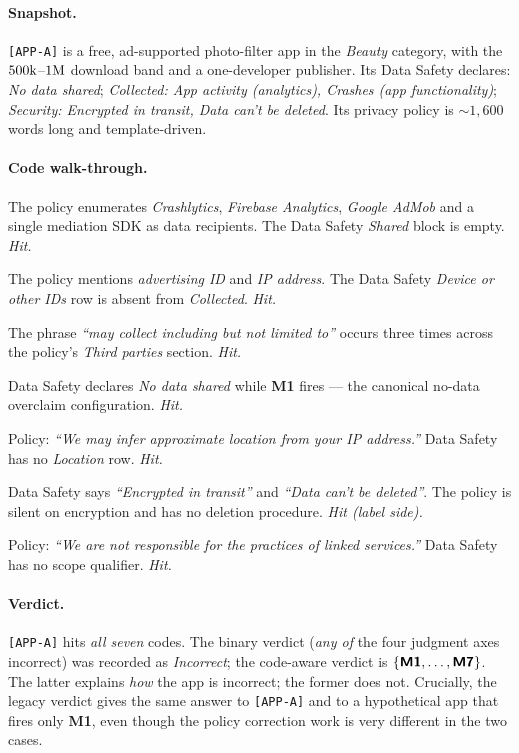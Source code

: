 \documentclass[11pt,a4paper]{article}
\newcommand{\code}[1]{\textsf{\textbf{#1}}}
\begin{document}
\paragraph{Snapshot.} \texttt{[APP-A]} is a free, ad-supported
photo-filter app in the \emph{Beauty} category, with the
$500{\rm k}$--$1{\rm M}$ download band and a one-developer publisher.
Its Data Safety declares: \textsl{No data shared}; \textsl{Collected: App
activity (analytics), Crashes (app functionality)}; \textsl{Security:
Encrypted in transit, Data can't be deleted}. Its privacy policy is
$\sim 1{,}600$ words long and template-driven.

\paragraph{Code walk-through.}
\begin{description}[topsep=2pt,itemsep=2pt,leftmargin=1.6em]
\item[\code{M1}] The policy enumerates \emph{Crashlytics}, \emph{Firebase
Analytics}, \emph{Google AdMob} and a single mediation SDK as data
recipients. The Data Safety \textsl{Shared} block is empty. \emph{Hit.}
\item[\code{M2}] The policy mentions \emph{advertising ID} and
\emph{IP address}. The Data Safety \textsl{Device or other IDs} row is
absent from \textsl{Collected}. \emph{Hit.}
\item[\code{M3}] The phrase \emph{``may collect including but not
limited to''} occurs three times across the policy's
\emph{Third parties} section. \emph{Hit.}
\item[\code{M4}] Data Safety declares \textsl{No data shared} while
\code{M1} fires --- the canonical no-data overclaim configuration.
\emph{Hit.}
\item[\code{M5}] Policy: \emph{``We may infer approximate location from
your IP address.''} Data Safety has no \textsl{Location} row.
\emph{Hit.}
\item[\code{M6}] Data Safety says \emph{``Encrypted in transit''} and
\emph{``Data can't be deleted''}. The policy is silent on encryption
and has no deletion procedure. \emph{Hit (label side).}
\item[\code{M7}] Policy: \emph{``We are not responsible for the
practices of linked services.''} Data Safety has no scope qualifier.
\emph{Hit.}
\end{description}

\paragraph{Verdict.} \texttt{[APP-A]} hits \emph{all seven} codes. The
binary verdict (\emph{any of} the four judgment axes incorrect) was
recorded as \emph{Incorrect}; the code-aware verdict is
$\{\code{M1},\dots,\code{M7}\}$. The latter explains \emph{how} the
app is incorrect; the former does not. Crucially, the legacy verdict
gives the same answer to \texttt{[APP-A]} and to a hypothetical app
that fires only \code{M1}, even though the policy correction work is
very different in the two cases.
\end{document}
